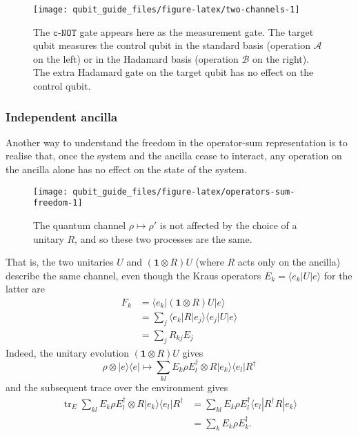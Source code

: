 \documentclass[fleqn]{article}
\begin{document}
\begin{figure}[H]

{\centering \texttt{[image: qubit\_guide\_files/figure-latex/two-channels-1]} 

}

\caption{The \(\texttt{c-NOT}\) gate appears here as the measurement gate. The target qubit measures the control qubit in the standard basis (operation \(\mathcal{A}\) on the left) or in the Hadamard basis (operation \(\mathcal{B}\) on the right). The extra Hadamard gate on the target qubit has no effect on the control qubit.}\label{fig:two-channels}
\end{figure}

\hypertarget{independent-ancilla}{%
\subsubsection{Independent ancilla}\label{independent-ancilla}}

Another way to understand the freedom in the operator-sum representation is to realise that, once the system and the ancilla cease to interact, any operation on the ancilla alone has no effect on the state of the system.



\begin{figure}[H]

{\centering \texttt{[image: qubit\_guide\_files/figure-latex/operators-sum-freedom-1]} 

}

\caption{The quantum channel \(\rho\mapsto\rho'\) is not affected by the choice of a unitary \(R\), and so these two processes are the same.}\label{fig:operators-sum-freedom}
\end{figure}

That is, the two unitaries \(U\) and \((\mathbf{1}\otimes R)U\) (where \(R\) acts only on the ancilla) describe the same channel, even though the Kraus operators \(E_k=\langle e_k|U|e\rangle\) for the latter are
\[
  \begin{aligned}
    F_k
    &= \langle e_k|(\mathbf{1}\otimes R)U|e\rangle
  \\&= \sum_j \langle e_k|R|e_j\rangle\langle e_j|U|e\rangle
  \\&= \sum_j R_{kj}E_j
  \end{aligned}
\]
Indeed, the unitary evolution \((\mathbf{1}\otimes R) U\) gives
\[
  \rho\otimes|e\rangle\langle e|
  \longmapsto
  \sum_{kl} E_k \rho E_l^\dagger \otimes R|e_k\rangle\langle e_l| R^\dagger
\]
and the subsequent trace over the environment gives
\[
  \begin{aligned}
    \operatorname{tr}_E \sum_{kl} E_k \rho E_l^\dagger \otimes R|e_k\rangle\langle e_l| R^\dagger
    &= \sum_{kl} E_k \rho E_l^\dagger \langle e_l| R^\dagger R|e_k\rangle
  \\&= \sum_{k} E_k \rho E_k^\dagger.
  \end{aligned}
\]
\end{document}
